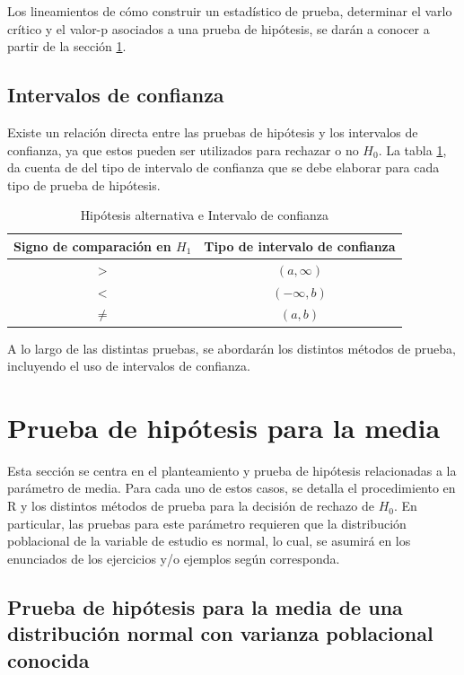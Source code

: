 \documentclass[
  11pt,
]{book}
\theoremstyle{definition}
\theoremstyle{definition}
\theoremstyle{definition}
\theoremstyle{definition}
\theoremstyle{remark}
\begin{document}
Los lineamientos de cómo construir un estadístico de prueba, determinar el varlo crítico y el valor-p asociados a una prueba de hipótesis, se darán a conocer a partir de la sección \ref{pruebas}.

\subsection{Intervalos de confianza}\label{intervalos-de-confianza-1}

Existe un relación directa entre las pruebas de hipótesis y los intervalos de confianza, ya que estos pueden ser utilizados para rechazar o no \(H_0\). La tabla \ref{tab:ICpruebas}, da cuenta de del tipo de intervalo de confianza que se debe elaborar para cada tipo de prueba de hipótesis.

\begin{table}[H]
\centering
\caption{\label{tab:ICpruebas}Hipótesis alternativa e Intervalo de confianza}
\centering
\begin{tabular}[t]{cc}
\toprule
Signo de comparación en $H_1$ & Tipo de intervalo de confianza\\
\midrule
$>$ & $(a,\infty )$\\
$<$ & $(-\infty ,b)$\\
$\neq$ & $(a,b)$\\
\bottomrule
\end{tabular}
\end{table}

A lo largo de las distintas pruebas, se abordarán los distintos métodos de prueba, incluyendo el uso de intervalos de confianza.

\section{Prueba de hipótesis para la media}\label{pruebas}

Esta sección se centra en el planteamiento y prueba de hipótesis relacionadas a la parámetro de media. Para cada uno de estos casos, se detalla el procedimiento en R y los distintos métodos de prueba para la decisión de rechazo de \(H_0\). En particular, las pruebas para este parámetro requieren que la distribución poblacional de la variable de estudio es normal, lo cual, se asumirá en los enunciados de los ejercicios y/o ejemplos según corresponda.

\subsection{Prueba de hipótesis para la media de una distribución normal con varianza poblacional conocida}\label{prueba-de-hipuxf3tesis-para-la-media-de-una-distribuciuxf3n-normal-con-varianza-poblacional-conocida}
\end{document}

